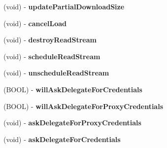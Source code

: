 \begin{DoxyCompactItemize}
\item 
\hypertarget{interface_a_s_i_h_t_t_p_request_07_08_aa1a2623d26fc118ae099a6325444a2f4}{
(void) -\/ {\bfseries update\-Partial\-Download\-Size}}
\label{interface_a_s_i_h_t_t_p_request_07_08_aa1a2623d26fc118ae099a6325444a2f4}

\item 
\hypertarget{interface_a_s_i_h_t_t_p_request_07_08_ad64a88ff354a1e9acd0e50f6bd6383af}{
(void) -\/ {\bfseries cancel\-Load}}
\label{interface_a_s_i_h_t_t_p_request_07_08_ad64a88ff354a1e9acd0e50f6bd6383af}

\item 
\hypertarget{interface_a_s_i_h_t_t_p_request_07_08_ab3dbbd41ced7e54f058267aaa2e80150}{
(void) -\/ {\bfseries destroy\-Read\-Stream}}
\label{interface_a_s_i_h_t_t_p_request_07_08_ab3dbbd41ced7e54f058267aaa2e80150}

\item 
\hypertarget{interface_a_s_i_h_t_t_p_request_07_08_a9298c802e2cd503d0f3ae6f508f59e52}{
(void) -\/ {\bfseries schedule\-Read\-Stream}}
\label{interface_a_s_i_h_t_t_p_request_07_08_a9298c802e2cd503d0f3ae6f508f59e52}

\item 
\hypertarget{interface_a_s_i_h_t_t_p_request_07_08_a036ae593e23c948377acca2d405ab265}{
(void) -\/ {\bfseries unschedule\-Read\-Stream}}
\label{interface_a_s_i_h_t_t_p_request_07_08_a036ae593e23c948377acca2d405ab265}

\item 
\hypertarget{interface_a_s_i_h_t_t_p_request_07_08_a2fb19d10e5d6449c7845042add6dc2a1}{
(\-B\-O\-O\-L) -\/ {\bfseries will\-Ask\-Delegate\-For\-Credentials}}
\label{interface_a_s_i_h_t_t_p_request_07_08_a2fb19d10e5d6449c7845042add6dc2a1}

\item 
\hypertarget{interface_a_s_i_h_t_t_p_request_07_08_a52ecd8ea9d13c585c86a7f9031f1d2e8}{
(\-B\-O\-O\-L) -\/ {\bfseries will\-Ask\-Delegate\-For\-Proxy\-Credentials}}
\label{interface_a_s_i_h_t_t_p_request_07_08_a52ecd8ea9d13c585c86a7f9031f1d2e8}

\item 
\hypertarget{interface_a_s_i_h_t_t_p_request_07_08_a545869781fbd1e24ed126da754536006}{
(void) -\/ {\bfseries ask\-Delegate\-For\-Proxy\-Credentials}}
\label{interface_a_s_i_h_t_t_p_request_07_08_a545869781fbd1e24ed126da754536006}

\item 
\hypertarget{interface_a_s_i_h_t_t_p_request_07_08_a44501e22716b6373457e7f235775662c}{
(void) -\/ {\bfseries ask\-Delegate\-For\-Credentials}}
\label{interface_a_s_i_h_t_t_p_request_07_08_a44501e22716b6373457e7f235775662c}


\end{DoxyCompactItemize}
